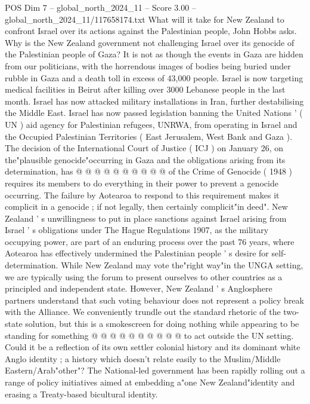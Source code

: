 \begin{textsample}{POS Dim 7 – global\_north\_2024\_11 – Score 3.00 – global\_north\_2024\_11/117658174.txt}  \label{ex:f7_pos_192}
What will it take for New Zealand to confront Israel over its actions against the Palestinian people, John Hobbs asks.
Why is the New Zealand government not challenging Israel over its genocide of the Palestinian people of Gaza?
It is not as though the events in Gaza are hidden from our politicians, with the horrendous images of bodies being buried under rubble in Gaza and a death toll in excess of 43,000 people.
Israel is now targeting medical facilities in Beirut after killing over 3000 Lebanese people in the last month.
Israel has now attacked military installations in Iran, further destabilising the Middle East.
Israel has now passed legislation banning the United Nations ' ( UN ) aid agency for Palestinian refugees, UNRWA, from operating in Israel and the Occupied Palestinian Territories ( East Jerusalem, West Bank and Gaza ).
The decision of the International Court of Justice ( ICJ ) on January 26, on the"plausible genocide"occurring in Gaza and the obligations arising from its determination, has @ @ @ @ @ @ @ @ @ @ of the Crime of Genocide ( 1948 ) requires its members to do everything in their power to prevent a genocide occurring.
The failure by Aotearoa to respond to this requirement makes it complicit in a genocide ; if not legally, then certainly complicit"in deed".
New Zealand ' s unwillingness to put in place sanctions against Israel arising from Israel ' s obligations under The Hague Regulations 1907, as the military occupying power, are part of an enduring process over the past 76 years, where Aotearoa has effectively undermined the Palestinian people ' s desire for self-determination.
While New Zealand may vote the"right way"in the UNGA setting, we are typically using the forum to present ourselves to other countries as a principled and independent state.
However, New Zealand ' s Anglosphere partners understand that such voting behaviour does not represent a policy break with the Alliance.
We conveniently trundle out the standard rhetoric of the two-state solution, but this is a smokescreen for doing nothing while appearing to be standing for something @ @ @ @ @ @ @ @ @ @ to act outside the UN setting.
Could it be a reflection of its own settler colonial history and its dominant white Anglo identity ; a history which doesn't relate easily to the Muslim/Middle Eastern/Arab"other"?
The National-led government has been rapidly rolling out a range of policy initiatives aimed at embedding a"one New Zealand"identity and erasing a Treaty-based bicultural identity.

\end{textsample}

